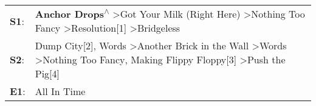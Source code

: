 \begin{supertabular}{p{0.03\textwidth}p{0.92\textwidth}}
 \textbf{S1}:  &                                                                   \textbf{Anchor Drops\textsuperscript{$\wedge$}} \textgreater \enspace Got Your Milk (Right Here)\textsuperscript{} \textgreater \enspace Nothing Too Fancy\textsuperscript{} \textgreater \enspace Resolution[1]\textsuperscript{} \textgreater \enspace Bridgeless\textsuperscript{}  \enspace  \\
 \textbf{S2}:  &  Dump City[2]\textsuperscript{}, \enspace Words\textsuperscript{} \textgreater \enspace Another Brick in the Wall\textsuperscript{} \textgreater \enspace Words\textsuperscript{} \textgreater \enspace Nothing Too Fancy\textsuperscript{}, \enspace Making Flippy Floppy[3]\textsuperscript{} \textgreater \enspace Push the Pig[4]\textsuperscript{}  \enspace  \\
 \textbf{E1}:  &                                                                                                                                                                                                                                                                                                                           All In Time\textsuperscript{}  \enspace  \\
\end{supertabular}
